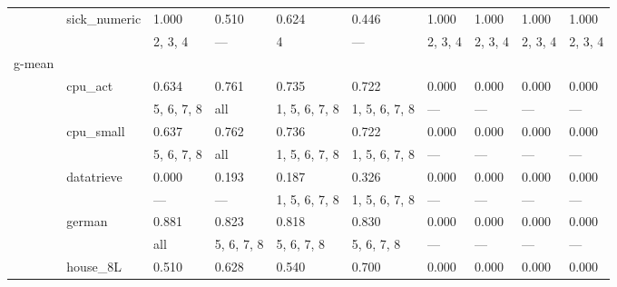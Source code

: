 \documentclass{article}
\begin{document}
\begin{center}
\begin{longtable}{p{1.2cm}p{1.8cm}p{1cm}p{1cm}p{1cm}p{1cm}p{1cm}p{1cm}p{1cm}p{1cm}}
             & sick\_numeric & 1.000            & 0.510            & 0.624            & 0.446            & 1.000            & 1.000            & 1.000            & 1.000            \\
             &              & 2, 3, 4          & ---              & 4                & ---              & 2, 3, 4          & 2, 3, 4          & 2, 3, 4          & 2, 3, 4          \\
 g-mean      &              &                  &                  &                  &                  &                  &                  &                  &                  \\
             & cpu\_act      & 0.634            & 0.761            & 0.735            & 0.722            & 0.000            & 0.000            & 0.000            & 0.000            \\
             &              & 5, 6, 7, 8       & all              & 1, 5, 6, 7, 8    & 1, 5, 6, 7, 8    & ---              & ---              & ---              & ---              \\
             & cpu\_small    & 0.637            & 0.762            & 0.736            & 0.722            & 0.000            & 0.000            & 0.000            & 0.000            \\
             &              & 5, 6, 7, 8       & all              & 1, 5, 6, 7, 8    & 1, 5, 6, 7, 8    & ---              & ---              & ---              & ---              \\
             & datatrieve   & 0.000            & 0.193            & 0.187            & 0.326            & 0.000            & 0.000            & 0.000            & 0.000            \\
             &              & ---              & ---              & 1, 5, 6, 7, 8    & 1, 5, 6, 7, 8    & ---              & ---              & ---              & ---              \\
             & german       & 0.881            & 0.823            & 0.818            & 0.830            & 0.000            & 0.000            & 0.000            & 0.000            \\
             &              & all              & 5, 6, 7, 8       & 5, 6, 7, 8       & 5, 6, 7, 8       & ---              & ---              & ---              & ---              \\
             & house\_8L     & 0.510            & 0.628            & 0.540            & 0.700            & 0.000            & 0.000            & 0.000            & 0.000            \\

\end{longtable}
\end{center}
\end{document}
